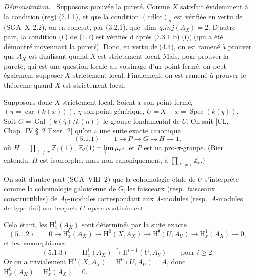 \documentclass[11pt]{article}
\newenvironment{prooftext}[1][Proof]{\par\noindent\emph{#1.}\ }{\par\medskip}
\renewcommand{\H}{\mathrm{H}}
\DeclareMathOperator{\Spec}{Spec}
\newcommand{\Z}{\mathbb{Z}}
\newcommand{\car}{\operatorname{car}}
\newcommand{\ol}[1]{\overline{#1}}
\providecommand{\Gal}{\operatorname{Gal}}
\providecommand{\car}{\operatorname{car}}
\providecommand{\car}{\operatorname{car}}
\providecommand{\Z}{\mathbb Z}
\providecommand{\Spec}{\operatorname{Spec}}
\providecommand{\Spec}{\operatorname{Spec}}
\providecommand{\Spec}{\operatorname{Spec}}
\providecommand{\car}{\operatorname{car}}
\providecommand{\Spec}{\operatorname{Spec}}
\providecommand{\Gal}{\operatorname{Gal}}
\begin{document}
\begin{prooftext}[Démonstration]
Supposons prouvée la pureté. Comme $X$ satisfait évidemment à la condition (reg) (3.1.1), et que la condition $(\mathrm{cdloc})_n$ est vérifiée en vertu de (SGA~X~2.2), on en conclut, par (3.2.1), que $\dim.q.inj(A_X)=2$. D'autre part, la condition (ii) de (1.7) est vérifiée d'après (3.3.1 b) (i)) (qui a été démontré moyennant la pureté). Donc, en vertu de (4.4), on est ramené à prouver que $A_X$ est dualisant quand $X$ est strictement local. Mais, pour prouver la pureté, qui est une question locale au voisinage d'un point fermé, on peut également supposer $X$ strictement local. Finalement, on est ramené à prouver le théorème quand $X$ est strictement local.

Supposons donc $X$ strictement local. Soient $x$ son point fermé, $(\pi=\car(k(x)))$, $\eta$ son point générique, $U=X-x=\Spec(k(\eta))$. Soit $G=\Gal(k(\ol{\eta})/k(\eta))$ le groupe fondamental de $U$. On sait [CL, Chap.~IV \S~2 Exer.~2] qu'on a une suite exacte canonique
\[
(5.1.1)\qquad 1\longrightarrow P\longrightarrow G\longrightarrow H\longrightarrow1,
\]
où $H=\prod_{\ell\ne\pi}\Z_\ell(1)$, $\Z_\ell(1)=\varprojlim \mu_{\ell^\nu}$, et $P$ est un pro-$\pi$-groupe. (Bien entendu, $H$ est isomorphe, mais non canoniquement, à $\prod_{\ell\ne\pi}\Z_\ell$.)

On sait d'autre part (SGA~VIII~2) que la cohomologie étale de $U$ s'interprète comme la cohomologie galoisienne de $G$, les faisceaux (resp.~faisceaux constructibles) de $A_U$-modules correspondant aux $A$-modules (resp.~$A$-modules de type fini) sur lesquels $G$ opère continûment.

Cela étant, les $\H_x^i(A_X)$ sont déterminés par la suite exacte
\[
(5.1.2)\qquad 0\longrightarrow \H_x^0(A_X)\longrightarrow \H^0(X,A_X)\longrightarrow \H^0(U,A_U)\longrightarrow \H_x^1(A_X)\longrightarrow0,
\]
et les isomorphismes
\[
(5.1.3)\qquad \H_x^i(A_X)\xrightarrow{\sim}\H^{i-1}(U,A_U)\qquad\text{pour }i\geqslant2.
\]
Or on a trivialement $\H^0(X,A_X)=\H^0(U,A_U)=A$, donc $\H_x^0(A_X)=\H_x^1(A_X)=0$.


\end{prooftext}
\end{document}

